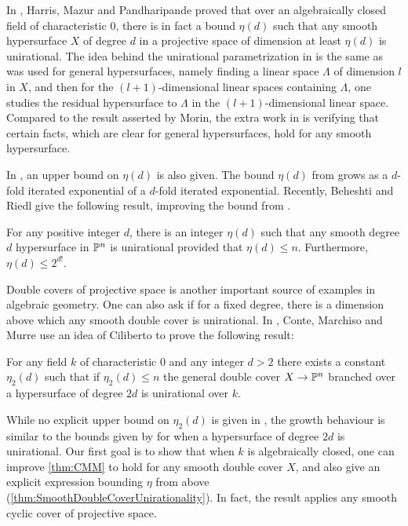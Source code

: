 In \cite{HMP}, Harris, Mazur and Pandharipande proved that over an algebraically closed field of characteristic $0$, there is in fact  a bound $\eta(d)$ such that any smooth hypersurface $X$ of degree $d$ in a projective space of dimension at least $\eta(d)$ is unirational. The idea behind the unirational parametrization in \cite{HMP} is the same as was used for general hypersurfaces, namely finding a linear space $\Lambda$ of dimension $l$ in $X$, and then for the $(l+1)$-dimensional linear spaces containing $\Lambda$, one studies the residual hypersurface to $\Lambda$ in the $(l+1)$-dimensional linear space. Compared to the result asserted by Morin, the extra work in \cite{HMP} is verifying that certain facts, which are clear for general hypersurfaces, hold for any smooth hypersurface.

In \cite{HMP}, an upper bound on $\eta(d)$ is also given. The bound $\eta(d)$ from \cite{HMP} grows as a $d$-fold iterated exponential of a $d$-fold iterated exponential. Recently, Beheshti and Riedl give the following result, improving the bound from \cite{HMP}.
	\begin{theorem}
		\label{thm:BRHypersurface}
		For any positive integer $d$, there is an integer $\eta(d)$ such that any smooth degree $d$ hypersurface in $\P^n$ is unirational provided that $\eta(d) \leq n$. Furthermore, $\eta(d) \leq 2^{d!}$.
	\end{theorem}
	
Double covers of projective space is another important source of examples in algebraic geometry. One can also ask if for a fixed degree, there is a dimension above which any smooth double cover is unirational. In \cite{CMMDoubleCover}, Conte, Marchiso and Murre use an idea of Ciliberto to prove the following result:
	\begin{theorem}
		\label{thm:CMM}
		For any field $k$ of characteristic 0 and any integer $d > 2$ there exists a constant $\eta_2(d)$ such that if $\eta_2(d) \leq n$ the general double cover $X \to \P^n$ branched over a hypersurface of degree $2d$ is unirational over $k$.
	\end{theorem}
While no explicit upper bound on $\eta_2(d)$ is given in \cite{CMMDoubleCover}, the growth behaviour is similar to the bounds given by \cite{Ramero} for when a hypersurface of degree $2d$ is unirational.
	Our first goal is to show that when $k$ is algebraically closed, one can improve \cref{thm:CMM} to hold for any smooth double cover $X$, and also give an explicit expression bounding $\eta$ from above (\cref{thm:SmoothDoubleCoverUnirationality}). In fact, the result applies any smooth cyclic cover of projective space.

